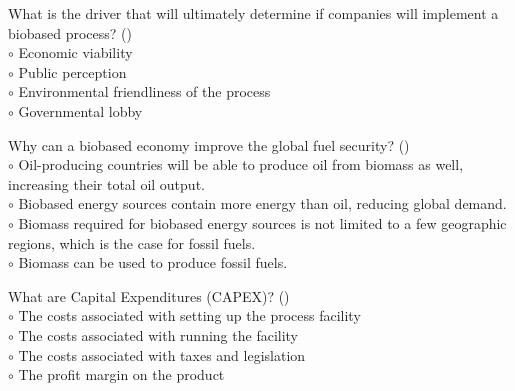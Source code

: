 \documentclass[]{beamer}
\begin{document}
\begin{CJK}{UTF8}{gbsn}
\begin{frame}[shrink] {} 
\addtocounter{questions}{1}
\color{blue}
  What is the driver that will ultimately determine if companies will implement a biobased process?
 ({})\\
\color{black}
\setlength{\parindent}{-0.4cm}
{\color{red}$\circ$}  Economic viability   \\
{\color{red}$\circ$} Public perception  \\
{\color{red}$\circ$} Environmental friendliness of the process   \\
{\color{red}$\circ$} Governmental lobby  \\
\end{frame}


\begin{frame}[shrink] {} 
\addtocounter{questions}{1}
\color{blue}
  Why can a biobased economy improve the global fuel security?
 ({})\\
\color{black}
\setlength{\parindent}{-0.4cm}
{\color{red}$\circ$} Oil-producing countries will be able to produce oil from biomass as well, increasing their total oil output.  \\
{\color{red}$\circ$} Biobased energy sources contain more energy than oil, reducing global demand.  \\
{\color{red}$\circ$}  Biomass required for biobased energy sources is not limited to a few geographic regions, which is the case for fossil fuels.  \\
{\color{red}$\circ$} Biomass can be used to produce fossil fuels.   \\
\end{frame}


\begin{frame}[shrink] {} 
\addtocounter{questions}{1}
\color{blue}
  What are Capital Expenditures (CAPEX)?
 ({})\\
\color{black}
\setlength{\parindent}{-0.4cm}
{\color{red}$\circ$}  The costs associated with setting up the process facility  \\
{\color{red}$\circ$} The costs associated with running the facility  \\
{\color{red}$\circ$} The costs associated with taxes and legislation  \\
{\color{red}$\circ$} The profit margin on the product  \\
\end{frame}



\end{CJK}
\end{document}
